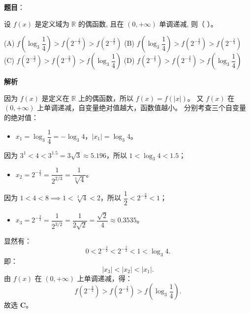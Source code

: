 \begin{answer}

\textbf{题目}：

设 $f(x)$ 是定义域为 $\mathbb{R}$ 的偶函数, 且在 $(0, +\infty)$ 单调递减, 则（ ）。

(A) $f\left(\log_3 \dfrac{1}{4}\right) > f\left(2^{-\frac{2}{3}}\right) > f\left(2^{-\frac{3}{2}}\right)$  
(B) $f\left(\log_3 \dfrac{1}{4}\right) > f\left(2^{-\frac{3}{2}}\right) > f\left(2^{-\frac{2}{3}}\right)$  
(C) $f\left(2^{-\frac{3}{2}}\right) > f\left(2^{-\frac{2}{3}}\right) > f\left(\log_3 \dfrac{1}{4}\right)$  
(D) $f\left(2^{-\frac{2}{3}}\right) > f\left(2^{-\frac{3}{2}}\right) > f\left(\log_3 \dfrac{1}{4}\right)$

\textbf{解析}

因为 $f(x)$ 是定义在 $\mathbb{R}$ 上的偶函数，所以 $f(x) = f(|x|)$。
又 $f(x)$ 在 $(0, +\infty)$ 上单调递减，自变量绝对值越大，函数值越小。
分别考查三个自变量的绝对值：
\begin{itemize}
\item $x_1 = \log_3 \dfrac{1}{4} = -\log_3 4$，$|x_1| = \log_3 4$。
\end{itemize}
  因为 $3^1 < 4 < 3^{1.5} = 3\sqrt{3} \approx 5.196$，所以 $1 < \log_3 4 < 1.5$；
\begin{itemize}
\item $x_2 = 2^{-\frac{2}{3}} = \dfrac{1}{2^{2/3}} = \dfrac{1}{\sqrt[3]{4}}$。
\end{itemize}
  因为 $1 < 4 < 8 \implies 1 < \sqrt[3]{4} < 2$，所以 $\dfrac{1}{2} < 2^{-\frac{2}{3}} < 1$；
\begin{itemize}
\item $x_3 = 2^{-\frac{3}{2}} = \dfrac{1}{2^{3/2}} = \dfrac{1}{2\sqrt{2}} = \dfrac{\sqrt{2}}{4} \approx 0.3535$。
\end{itemize}
显然有：
\nopagebreak[4]
\[0 < 2^{-\frac{3}{2}} < 2^{-\frac{2}{3}} < 1 < \log_3 4.\]
即：
\nopagebreak[4]
\[|x_3| < |x_2| < |x_1|.\]
由 $f(x)$ 在 $(0, +\infty)$ 上单调递减，得：
\nopagebreak[4]
\[f\left(2^{-\frac{3}{2}}\right) > f\left(2^{-\frac{2}{3}}\right) > f\left(\log_3 \frac{1}{4}\right).\]
故选 \textbf{C}。


\end{answer}

